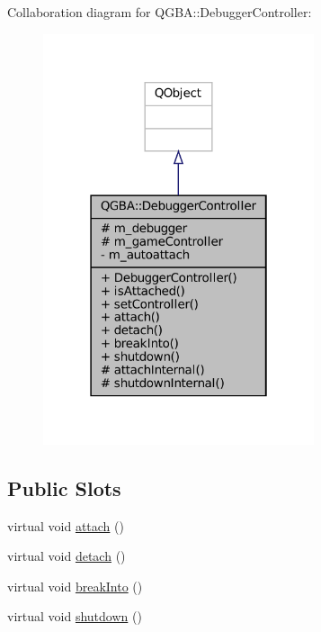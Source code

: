 Collaboration diagram for Q\+G\+BA\+:\+:Debugger\+Controller\+:
\nopagebreak
\begin{figure}[H]
\begin{center}
\leavevmode
\includegraphics[width=226pt]{class_q_g_b_a_1_1_debugger_controller__coll__graph}
\end{center}
\end{figure}
\subsection*{Public Slots}
\begin{DoxyCompactItemize}
\item 
virtual void \mbox{\hyperlink{class_q_g_b_a_1_1_debugger_controller_a3096b2a62e42b414125a5f16c6cb49bc}{attach}} ()
\item 
virtual void \mbox{\hyperlink{class_q_g_b_a_1_1_debugger_controller_a1154717cf3833d1d755687329d1fd093}{detach}} ()
\item 
virtual void \mbox{\hyperlink{class_q_g_b_a_1_1_debugger_controller_ad2b19fb1fa3041f510d01f4a0d94e314}{break\+Into}} ()
\item 
virtual void \mbox{\hyperlink{class_q_g_b_a_1_1_debugger_controller_a63d465bde2ae7098a041e195e96e88e6}{shutdown}} ()
\end{DoxyCompactItemize}

